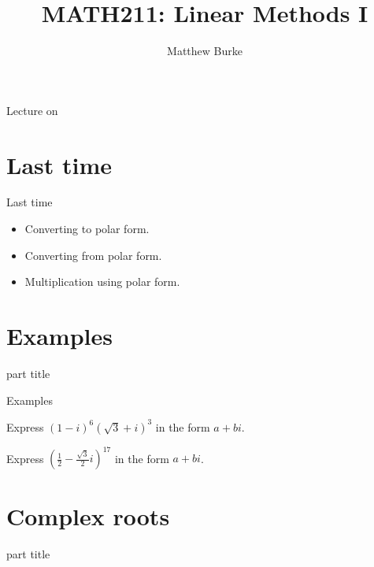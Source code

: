 \documentclass{beamer}
\title{MATH211: Linear Methods I}
\author{Matthew Burke}
\date{\lectureDate}
\newcommand{\lectureDate}{\formatdate{22}{11}{2018}}
\begin{document}
\frame{\titlepage}

\begin{frame}{Lecture on \lectureDate}
  \tableofcontents
\end{frame}

\section*{Last time}
\label{sec:Last-time}

\begin{frame}{Last time}
	\begin{itemize}
		\item Converting to polar form.\vfill
		\item Converting from polar form.\vfill
		\item Multiplication using polar form.
	\end{itemize}
\end{frame}

\section{Examples}

\begin{frame}
\begin{beamercolorbox}[sep=12pt,center]{part title}
\insertsection\par
\end{beamercolorbox}
\end{frame}

\begin{frame}{Examples}
\begin{example}
Express $(1-i)^6(\sqrt{3}+i)^3$ in the form $a+bi$. %
\end{example}
\begin{example}
Express $(\frac{1}{2}-\frac{\sqrt{3}}{2}i)^{17}$ in the form $a+bi$. %
\end{example}
\end{frame}

\section{Complex roots}

\begin{frame}
\begin{beamercolorbox}[sep=12pt,center]{part title}
\insertsection\par
\end{beamercolorbox}
\end{frame}
\end{document}

